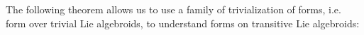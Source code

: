 



The following theorem allows us to use a family of trivialization of forms, i.e. form over trivial Lie algebroids, to understand forms on transitive Lie algebroids:

